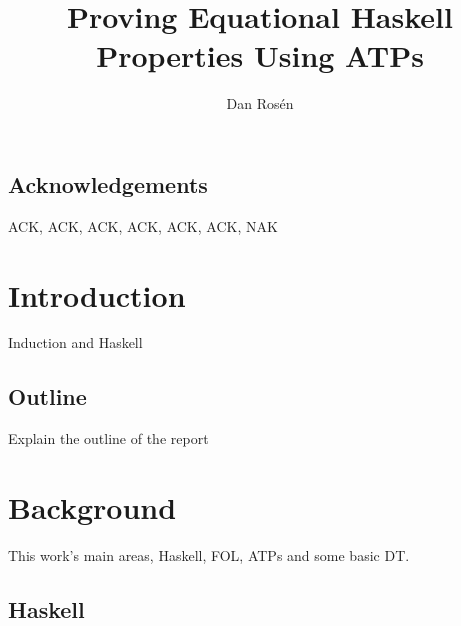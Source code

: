 \documentclass{report}
\begin{document}
\title{Proving Equational Haskell Properties Using ATPs}
\author{Dan Rosén}
\maketitle


\newpage
{}


\newpage
\pagestyle{empty}
\section*{Acknowledgements}
\vspace{5mm}
ACK, ACK, ACK, ACK, ACK, ACK, NAK


\newpage
\tableofcontents
{}

\newpage
\setcounter{page}{1}

\chapter{Introduction}

Induction and Haskell

\section{Outline}

Explain the outline of the report

\chapter{Background}

This work's main areas, Haskell, FOL, ATPs and some basic DT.

\section{Haskell}
\end{document}
